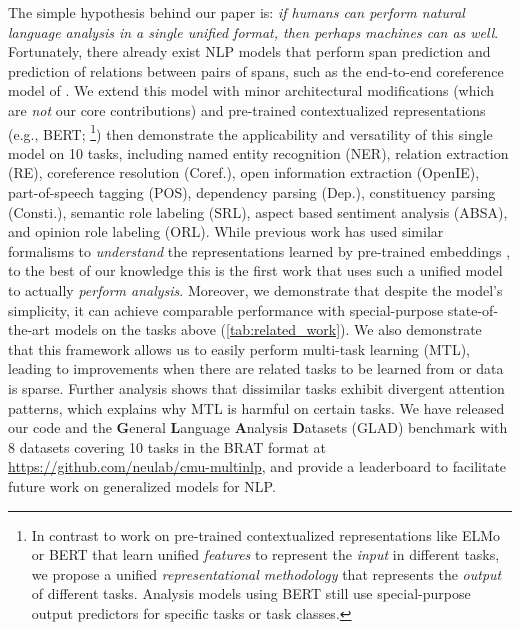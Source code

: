 \documentclass[11pt,a4paper]{article}
\def\benchmarkname{GLAD\xspace}
\begin{document}
The simple hypothesis behind our paper is: \emph{if humans can perform natural language analysis in a single unified format, then perhaps machines can as well}.
Fortunately, there already exist NLP models that perform span prediction and prediction of relations between pairs of spans, such as the end-to-end coreference model of \citet{lee:17:e2ecoref}.
We extend this model with minor architectural modifications (which are \emph{not} our core contributions) and pre-trained contextualized representations (e.g., BERT; \citet{devlin-etal-2019-bert}\footnote{In contrast to work on pre-trained contextualized representations like ELMo \citep{peters-etal-2018-deep} or BERT \citep{devlin-etal-2019-bert} that learn unified \emph{features} to represent the \emph{input} in different tasks, we propose a unified \emph{representational methodology} that represents the \emph{output} of different tasks. Analysis models using BERT still use special-purpose output predictors for specific tasks or task classes.}) then demonstrate the applicability and versatility of this single model on 10 tasks, including named entity recognition (NER), relation extraction (RE), coreference resolution (Coref.), open information extraction (OpenIE), part-of-speech tagging (POS), dependency parsing (Dep.), constituency parsing (Consti.), semantic role labeling (SRL), aspect based sentiment analysis (ABSA), and opinion role labeling (ORL).
While previous work has used similar formalisms to \emph{understand} the representations learned by pre-trained embeddings \citep{tenney:19:bertpipeline,tenney:19:bertprobe}, to the best of our knowledge this is the first work that uses such a unified model to actually \emph{perform analysis}.
Moreover, we demonstrate that despite the model's simplicity, it can achieve comparable performance with special-purpose state-of-the-art models on the tasks above (\autoref{tab:related_work}).
We also demonstrate that this framework allows us to easily perform multi-task learning (MTL), leading to improvements when there are related tasks to be learned from or data is sparse.
Further analysis shows that dissimilar tasks exhibit divergent attention patterns, which explains why MTL is harmful on certain tasks.
We have released our code and the \textbf{G}eneral \textbf{L}anguage \textbf{A}nalysis \textbf{D}atasets (\benchmarkname) benchmark with 8 datasets covering 10 tasks in the BRAT format at \url{https://github.com/neulab/cmu-multinlp},
and provide a leaderboard to facilitate future work on generalized models for NLP.
\end{document}

